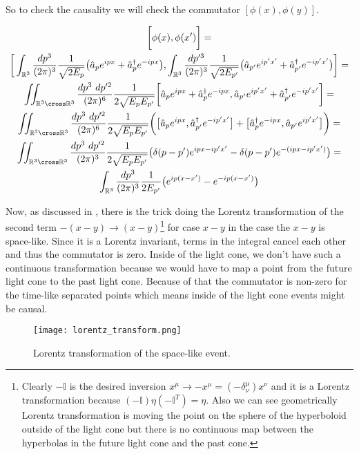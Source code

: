 So to check the causality we will check the commutator $[\phi(x), \phi(y)]$.

\begin{equation*}
    \begin{gathered}
        \bigg[\phi(x), \phi(x')\bigg] = \\
        \bigg[
            \int_{\mathbb{R}^{3}} \frac{dp^{3}}{(2 \pi)^{3}} \frac{1}{\sqrt{2 E_{p}}} \big(\hat{a}_{p} e^{ipx} + \hat{a}^{\dagger}_{p} e^{-ipx}\big),
            \int_{\mathbb{R}^{3}} \frac{dp'^{3}}{(2 \pi)^{3}} \frac{1}{\sqrt{2 E_{p'}}} \big(\hat{a}_{p'} e^{ip'x'} + \hat{a}^{\dagger}_{p'} e^{-ip'x'}\big)
        \bigg] = \\
        \iint_{\mathbb{R}^{3} \cross \mathbb{R}^{3}} \frac{dp^{3} \ dp'^{2}}{(2 \pi)^{6}} \frac{1}{2 \sqrt{E_{p} E_{p'}}}
        \bigg[
            \hat{a}_{p} e^{ipx} + \hat{a}^{\dagger}_{p} e^{-ipx},
            \hat{a}_{p'} e^{ip'x'} + \hat{a}^{\dagger}_{p'} e^{-ip'x'}
        \bigg] = \\
        \iint_{\mathbb{R}^{3} \cross \mathbb{R}^{3}} \frac{dp^{3} \ dp'^{2}}{(2 \pi)^{6}} \frac{1}{2 \sqrt{E_{p} E_{p'}}}
        \bigg(
            \big[\hat{a}_{p} e^{ipx}, \hat{a}^{\dagger}_{p'} e^{-ip'x'}\big] + \big[\hat{a}^{\dagger}_{p} e^{-ipx}, \hat{a}_{p'} e^{ip'x'}\big]
        \bigg) = \\
        \iint_{\mathbb{R}^{3} \cross \mathbb{R}^{3}} \frac{dp^{3} \ dp'^{2}}{(2 \pi)^{3}} \frac{1}{2 \sqrt{E_{p} E_{p'}}}
        \big(\delta(p - p') e^{ipx - ip'x'} - \delta(p - p') e^{-(ipx - ip'x')} \big) = \\
        \int_{\mathbb{R}^{3}} \frac{dp^{3}}{(2 \pi)^{3}} \frac{1}{2 E_{p'}} \big(e^{ip(x - x')} - e^{-ip(x - x')} \big)
    \end{gathered}
\end{equation*}

Now, as discussed in \cite{peskin_schroeder}, there is the trick doing the Lorentz transformation of the second term $-(x - y) \to (x - y)$\footnote{Clearly $-\mathbb{I}$ 
is the desired inversion $x^{\mu} \to -x^{\mu} = (-\delta^{\mu}_{\nu}) x^{\nu}$ and it is a Lorentz transformation because $(-\mathbb{I}) \eta 
(-\mathbb{I}^{T}) = \eta$. Also we can see geometrically Lorentz transformation is moving the point on the sphere of the hyperboloid outside of the
light cone but there is no continuous map between the hyperbolas in the future light cone and the past cone.} for case $x -  y$ in the case the $x - y$ is space-like. Since it
is a Lorentz invariant, terms in the integral cancel each other and thus the commutator is zero. Inside of the light cone, we don't have such a continuous transformation
because we would have to map a point from the future light cone to the past light cone. Because of that the commutator is non-zero for the time-like separated points which means 
inside of the light cone events might be causal.

\begin{figure}[H]
    \centering
    \texttt{[image: lorentz\_transform.png]}
    \caption{Lorentz transformation of the space-like event.}
    \label{fig:lorentz_transform}
\end{figure}


